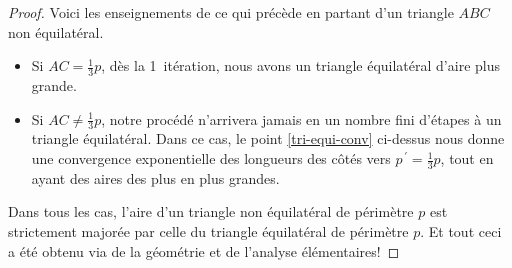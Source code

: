 \begin{proof}
	Voici les enseignements de ce qui précède en partant d'un triangle $ABC$ non équilatéral.
	\begin{itemize}
		\item Si $AC = \frac13p$, dès la 1\iere\ itération, nous avons un triangle équilatéral d'aire plus grande.
		
		
		\item Si $AC \neq \frac13p$, notre procédé n'arrivera jamais en un nombre fini d'étapes à un triangle équilatéral.
		Dans ce cas, le point \ref{tri-equi-conv} ci-dessus nous donne une convergence exponentielle des longueurs des côtés vers $p^{\,\prime} = \frac13 p$, tout en ayant des aires des plus en plus grandes.
	\end{itemize}
	
	Dans tous les cas, l'aire d'un triangle non équilatéral de périmètre $p$ est strictement majorée par celle du triangle équilatéral de périmètre $p$. Et tout ceci a été obtenu via de la géométrie et de l'analyse élémentaires!
\end{proof}
